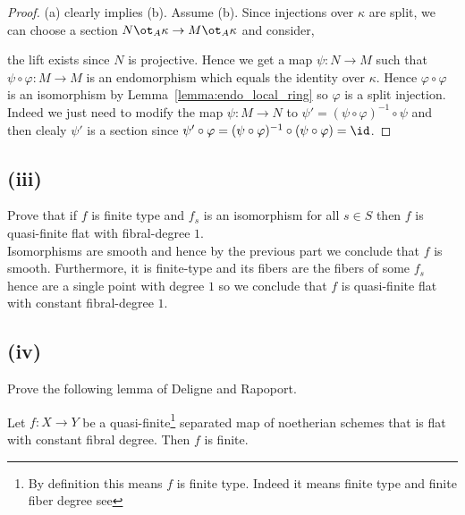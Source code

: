 \documentclass[12pt]{article}
\begin{document}
\begin{proof}
(a) clearly implies (b). Assume (b). Since injections over $\kappa$ are split, we can choose a section $N \ot_A \kappa \to M \ot_A \kappa$ and consider,
\begin{center}
\end{center}
the lift exists since $N$ is projective. Hence we get a map $\psi : N \to M$ such that $\psi \circ \varphi : M \to M$ is an endomorphism which equals the identity over $\kappa$. Hence $\varphi \circ \varphi$ is an isomorphism by Lemma~\ref{lemma:endo_local_ring} so $\varphi$ is a split injection. Indeed we just need to modify the map $\psi : M \to N$ to $\psi' = (\psi \circ \varphi)^{-1} \circ \psi$ and then clealy $\psi'$ is a section since $\psi' \circ \varphi = (\psi \circ \varphi)^{-1} \circ (\psi \circ \varphi) = \id$.
\end{proof}

\subsection{(iii)}

Prove that if $f$ is finite type and $f_s$ is an isomorphism for all $s \in S$ then $f$ is quasi-finite flat with fibral-degree $1$.
\bigskip\\
Isomorphisms are smooth and hence by the previous part we conclude that $f$ is smooth. Furthermore, it is finite-type and its fibers are the fibers of some $f_s$ hence are a single point with degree $1$ so we conclude that $f$ is quasi-finite flat with constant fibral-degree $1$.

\subsection{(iv)}

Prove the following lemma of Deligne and Rapoport.

\begin{prop}
Let $f : X \to Y$ be a quasi-finite\footnote{By definition this means $f$ is finite type. Indeed it means finite type and finite fiber degree see  } separated map of noetherian schemes that is flat with constant fibral degree. Then $f$ is finite.
\end{prop}
\end{document}
